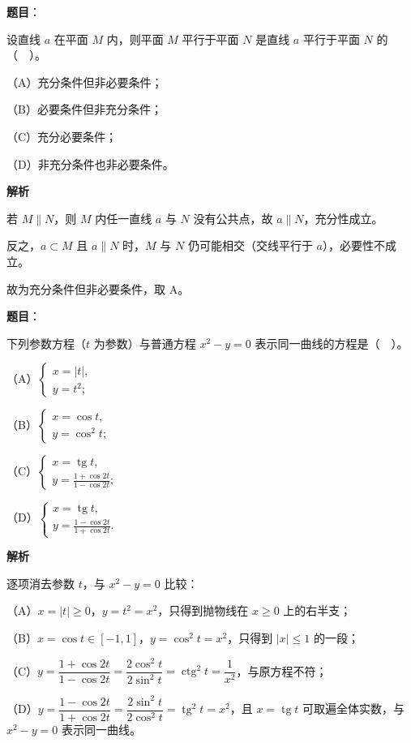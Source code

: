 \begin{answer}

\textbf{题目}：

设直线 $a$ 在平面 $M$ 内，则平面 $M$ 平行于平面 $N$ 是直线 $a$ 平行于平面 $N$ 的（　）。

（A）充分条件但非必要条件；

（B）必要条件但非充分条件；

（C）充分必要条件；

（D）非充分条件也非必要条件。

\textbf{解析}

若 $M\parallel N$，则 $M$ 内任一直线 $a$ 与 $N$ 没有公共点，故 $a\parallel N$，充分性成立。

反之，$a\subset M$ 且 $a\parallel N$ 时，$M$ 与 $N$ 仍可能相交（交线平行于 $a$），必要性不成立。

故为充分条件但非必要条件，取 A。


\end{answer}
\begin{answer}

\textbf{题目}：

下列参数方程（$t$ 为参数）与普通方程 $x^{2}-y=0$ 表示同一曲线的方程是（　）。

（A）$\begin{cases}x=|t|,\\ y=t^{2};\end{cases}$

（B）$\begin{cases}x=\cos t,\\ y=\cos^{2}t;\end{cases}$

（C）$\begin{cases}x=\operatorname{tg}t,\\ y=\frac{1+\cos 2t}{1-\cos 2t};\end{cases}$

（D）$\begin{cases}x=\operatorname{tg}t,\\ y=\frac{1-\cos 2t}{1+\cos 2t}.\end{cases}$

\textbf{解析}

逐项消去参数 $t$，与 $x^{2}-y=0$ 比较：

（A）$x=|t|\ge 0$，$y=t^{2}=x^{2}$，只得到抛物线在 $x\ge 0$ 上的右半支；

（B）$x=\cos t\in[-1,1]$，$y=\cos^{2}t=x^{2}$，只得到 $|x|\le 1$ 的一段；

（C）$y=\dfrac{1+\cos 2t}{1-\cos 2t}=\dfrac{2\cos^{2}t}{2\sin^{2}t}=\operatorname{ctg}^{2}t=\dfrac{1}{x^{2}}$，与原方程不符；

（D）$y=\dfrac{1-\cos 2t}{1+\cos 2t}=\dfrac{2\sin^{2}t}{2\cos^{2}t}=\operatorname{tg}^{2}t=x^{2}$，且 $x=\operatorname{tg}t$ 可取遍全体实数，与 $x^{2}-y=0$ 表示同一曲线。


\end{answer}
